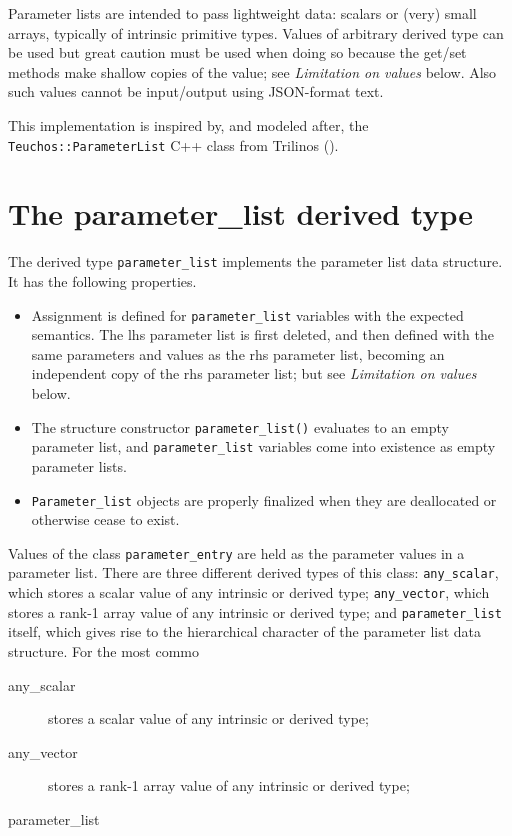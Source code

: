 \documentclass[11pt]{article}
\begin{document}
Parameter lists are intended to pass lightweight data: scalars or (very)
small arrays, typically of intrinsic primitive types.  Values of arbitrary
derived type can be used but great caution must be used when doing so
because the get/set methods make shallow copies of the value; see
\emph{Limitation on values} below.  Also such values cannot be input/output
using JSON-format text.

This implementation is inspired by, and modeled after, the
\texttt{Teuchos::ParameterList} C++ class from Trilinos
().

\section{The parameter_list derived type}
The derived type \texttt{parameter_list} implements the parameter list data
structure.  It has the following properties.
\begin{itemize}
\item
  Assignment is defined for \texttt{parameter_list} variables with the
  expected semantics.  The lhs parameter list is first deleted, and then
  defined with the same parameters and values as the rhs parameter list,
  becoming an independent copy of the rhs parameter list; but see
  \emph{Limitation on values} below.
\item
  The structure constructor \texttt{parameter_list()} evaluates to an
  empty parameter list, and \texttt{parameter_list} variables come into
  existence as empty parameter lists.
\item
  \texttt{Parameter_list} objects are properly finalized when they are
  deallocated or otherwise cease to exist.
\end{itemize}

Values of the class \texttt{parameter_entry} are held as the parameter
values in a parameter list.  There are three different derived types of
this class: \texttt{any_scalar}, which stores a scalar value of any intrinsic
or derived type; \texttt{any_vector}, which stores a rank-1 array value of
any intrinsic or derived type; and \texttt{parameter_list} itself, which
gives rise to the hierarchical character of the parameter list data structure.
For the most commo

\begin{description}
\item[any_scalar] stores a scalar value of any intrinsic or derived type;
\item[any_vector] stores a rank-1 array value of any intrinsic or derived type;
\item[parameter_list]
\end{description}
\end{document}
